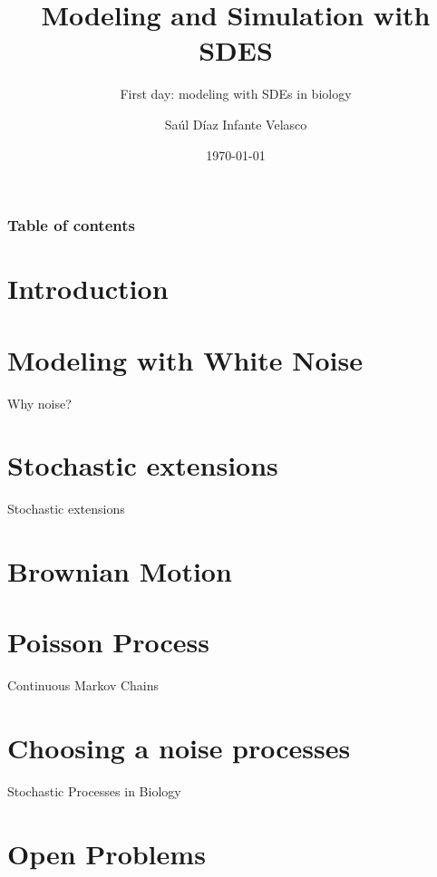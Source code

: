 \documentclass[9pt]{beamer}
\title{Modeling and Simulation with SDES}
\subtitle{First day: modeling with SDEs in biology}
\author{Saúl Díaz Infante Velasco}
\institute{CONACYT-UNIVERSIDAD de SONORA, Cimat, Guanajuato Gto}
\date{\today}
\begin{document}
    \titlepage
        \begin{frame}
        \frametitle{Table of contents}
        \tableofcontents
    \end{frame}
    \section{Introduction}
    \section{Modeling with White Noise}
        \begin{frame}{Why noise?}
        \end{frame}

    \section{Stochastic extensions}
        \begin{frame}{Stochastic extensions}
        \end{frame}
    \section{Brownian Motion}
    
    \section{Poisson Process}
    \begin{frame}{Continuous Markov Chains}
        \end{frame}
    \section{Choosing a noise processes}
        \begin{frame}{Stochastic Processes in Biology}
        
        \end{frame}
    \section{Open Problems}
\end{document}
